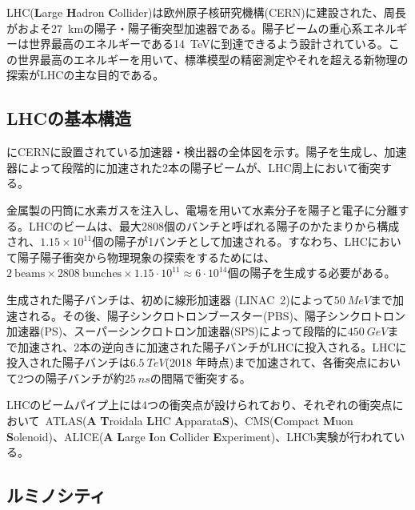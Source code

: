 LHC(\textbf{L}arge \textbf{H}adron \textbf{C}ollider)は欧州原子核研究機構(CERN)に建設された、周長がおよそ27\ \si{km}の陽子・陽子衝突型加速器である。陽子ビームの重心系エネルギーは世界最高のエネルギーである14\ \si{TeV}に到達できるよう設計されている。この世界最高のエネルギーを用いて、標準模型の精密測定やそれを超える新物理の探索がLHCの主な目的である。

\subsection{LHCの基本構造}
にCERNに設置されている加速器・検出器の全体図を示す。陽子を生成し、加速器によって段階的に加速された2本の陽子ビームが、LHC周上において衝突する。

金属製の円筒に水素ガスを注入し、電場を用いて水素分子を陽子と電子に分離する。LHCのビームは、最大2808個のバンチと呼ばれる陽子のかたまりから構成され、$1.15\times 10^{11}$個の陽子が1バンチとして加速される。すなわち、LHCにおいて陽子陽子衝突から物理現象の探索をするためには、$2\ \mathrm{beams} \times 2808\ \mathrm{bunches}\times 1.15\cdot10^{11}\approx 6\cdot 10^{14}$個の陽子を生成する必要がある。

生成された陽子バンチは、初めに線形加速器 (LINAC\ 2)によって$50\ \si{MeV}$まで加速される。その後、陽子シンクロトロンブースター(PBS)、陽子シンクロトロン加速器(PS)、スーパーシンクロトロン加速器(SPS)によって段階的に$450\ \si{GeV}$まで加速され、2本の逆向きに加速された陽子バンチがLHCに投入される。LHCに投入された陽子バンチは$6.5\ \si{TeV}$(2018 年時点)まで加速されて、各衝突点において2つの陽子バンチが約$25\ \si{ns}$の間隔で衝突する。

LHCのビームパイプ上には4つの衝突点が設けられており、それぞれの衝突点において\ ATLAS(\textbf{A} \textbf{T}roidala \textbf{L}HC \textbf{A}pparata\textbf{S})、CMS(\textbf{C}ompact \textbf{M}uon \textbf{S}olenoid)、ALICE(\textbf{A} \textbf{L}arge \textbf{I}on \textbf{C}ollider \textbf{E}xperiment)、LHCb実験が行われている。


\subsection{ルミノシティ}
\label{sec:luminosity}

